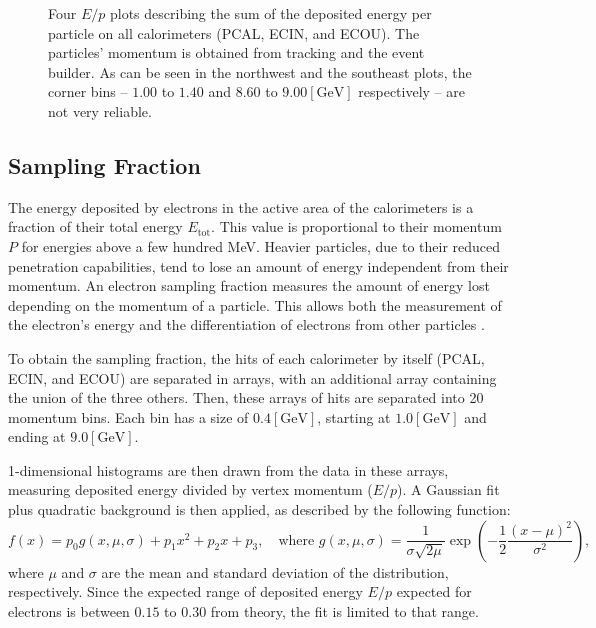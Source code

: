     \begin{figure}[b!]
        \centering{}
        \caption[Calorimeters $E/p$ plots]{Four $E/p$ plots describing the sum of the deposited energy per particle on all calorimeters (PCAL, ECIN, and ECOU). The particles' momentum is obtained from tracking and the event builder. As can be seen in the northwest and the southeast plots, the corner bins -- $1.00$ to $1.40$ and $8.60$ to $9.00 [\text{GeV}]$ respectively -- are not very reliable.}
        \label{fig::sf_1d}
    \end{figure}

\subsection{Sampling Fraction}
\label{ssec::sampling_fraction}
    The energy deposited by electrons in the active area of the calorimeters is a fraction of their total energy $E_\text{tot}$.
    This value is proportional to their momentum $P$ for energies above a few hundred MeV.
    Heavier particles, due to their reduced penetration capabilities, tend to lose an amount of energy independent from their momentum.
    An electron sampling fraction measures the amount of energy lost depending on the momentum of a particle.
    This allows both the measurement of the electron's energy and the differentiation of electrons from other particles \cite{wigmans2000}.

    To obtain the sampling fraction, the hits of each calorimeter by itself (PCAL, ECIN, and ECOU) are separated in arrays, with an additional array containing the union of the three others.
    Then, these arrays of hits are separated into 20 momentum bins.
    Each bin has a size of $0.4 [\text{GeV}]$, starting at $1.0 [\text{GeV}]$ and ending at $9.0 [\text{GeV}]$.

    1-dimensional histograms are then drawn from the data in these arrays, measuring deposited energy divided by vertex momentum ($E/p$).
    A Gaussian fit plus quadratic background is then applied, as described by the following function:
    \begin{equation*}
        f(x) = p_0 g(x, \mu, \sigma) + p_1 x^2 + p_2 x + p_3, \hspace{12pt}
        \text{where} \hspace{4pt}
        g(x, \mu, \sigma) = \frac{1}{\sigma \sqrt{2\mu}} \exp \left(-\frac{1}{2} \frac{(x - \mu)^2}{\sigma^2}\right),
    \end{equation*}
    where $\mu$ and $\sigma$ are the mean and standard deviation of the distribution, respectively.
    Since the expected range of deposited energy $E/p$ expected for electrons is between $0.15$ to $0.30$ from theory, the fit is limited to that range.

